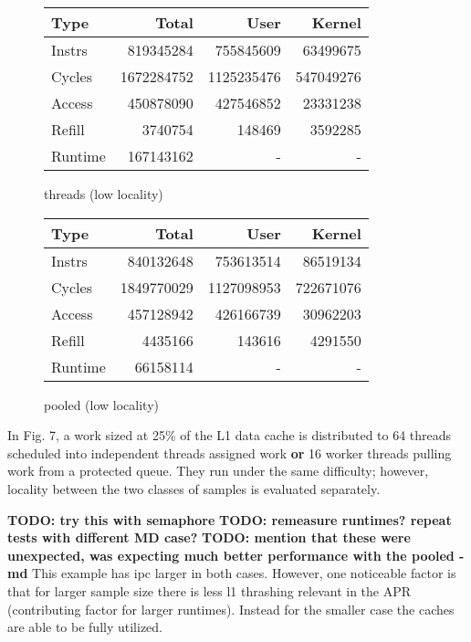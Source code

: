 \documentclass[11pt]{article}
\begin{document}
\begin{figure*}[h]
	\begin{subtable}{.48\textwidth} 
		\centering
		\begin{tabular}{ l|rrr }
			Type    & Total      & User       & Kernel    \\
			\hline
			Instrs  & 819345284  & 755845609  & 63499675  \\
			Cycles  & 1672284752 & 1125235476 & 547049276 \\
			Access  & 450878090  & 427546852  & 23331238  \\
			Refill  & 3740754    & 148469     & 3592285   \\
			Runtime & 167143162  & -          & -         \\
			\hline
		\end{tabular}
		\caption{threads (low locality)}
	\end{subtable}
	\hfill
	\begin{subtable}{.48\textwidth} 
		\centering
		\begin{tabular}{ l|rrr }
			Type    & Total      & User       & Kernel    \\
			\hline
			Instrs  & 840132648  & 753613514  & 86519134  \\
			Cycles  & 1849770029 & 1127098953 & 722671076 \\
			Access  & 457128942  & 426166739  & 30962203  \\
			Refill  & 4435166    & 143616     & 4291550   \\
			Runtime & 66158114   & -          & -         \\
			\hline
		\end{tabular}
		\caption{pooled (low locality)}
	\end{subtable}
\end{figure*}

In Fig. 7, a work sized at 25\% of the L1 data cache is distributed to 64 threads scheduled into independent threads assigned work \textbf{or} 16 worker threads pulling work from a protected queue.  They run under the same difficulty; however, locality between the two classes of samples is evaluated separately.

\textbf{TODO: try this with semaphore}
\textbf{TODO: remeasure runtimes? repeat tests with different MD case?}
\textbf{TODO: mention that these were unexpected, was expecting much better performance with the pooled - md}
This example has ipc larger in both cases.    However, one noticeable factor is that for larger sample size there is less l1 thrashing relevant in the APR (contributing factor for larger runtimes).  Instead for the smaller case the caches are able to be fully utilized.
\end{document}
